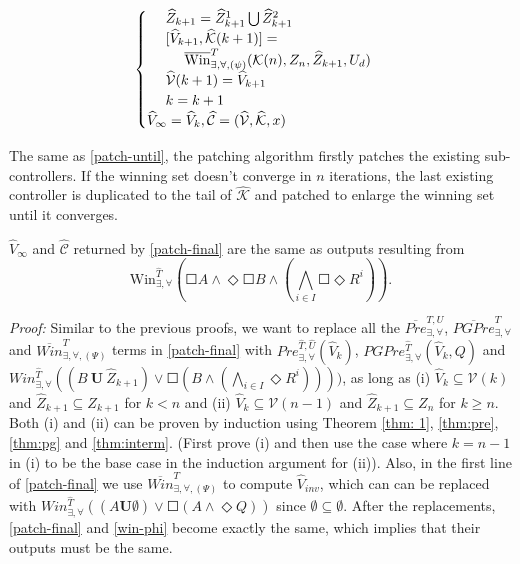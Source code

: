 {\begin{align}
\begin{cases}
\ \ \ \ \widehat{Z}_{k+1} = \widehat{Z}_{k+1}^1\bigcup\widehat{Z}_{k+1}^2  \\
\ \ \ \ [\widehat{V}_{k+1},\widehat{\mathcal{K}}(k+1)]=\\
\ \ \ \ \ \ \ \ \overline{\text{Win}}_{\exists,\forall,(\psi)}^{T}(\mathcal{K}(n),Z_{n},\widehat{Z}_{k+1},U_d)\\
\ \ \ \ \widehat{\mathcal{V}}(k+1)=\widehat{V}_{k+1}\\
\ \ \ \ {\color{black} k = k+1}\\
\widehat{V}_\infty = \widehat{V}_k, \widehat{\mathcal{C}} = (\widehat{\mathcal{V}},\widehat{\mathcal{K}},x) 
\end{cases}\label{patch-final}
\end{align}
}

The same as \eqref{patch-until}, the patching algorithm firstly patches the existing sub-controllers. If the winning set doesn't converge in $ n $ iterations, the last existing controller is duplicated to the tail of $ \widehat{\mathcal{K}} $ and patched to enlarge the winning set until it converges. 

\begin{theorem}
	$ \widehat{V}_\infty $ and $ \widehat{\mathcal{C}} $ returned by \eqref{patch-final} are the same as outputs resulting from
\begin{displaymath}
	\text{Win}_{\exists, \forall}^{\widehat{T}}\left(\Square A \wedge \Diamond \Square B \wedge \left( \bigwedge_{i\in I} \Square \Diamond R^i\right)\right).
\end{displaymath} \label{thm:phi}
\end{theorem}
\emph{Proof:} Similar to the previous proofs, we want to replace all the $ \overline{Pre}^{T,U}_{\exists,\forall} $, $ \overline{PGPre}^{T}_{\exists,\forall} $ and $ \overline{Win}_{\exists,\forall, (\Psi)}^{T} $ terms in \eqref{patch-final} with $ Pre^{\widehat{T},\widehat{U}}_{\exists,\forall}(\widehat{V}_k) $, $PGPre^{\widehat{T}}_{\exists,\forall}(\widehat{V}_k, Q) $ and $ Win^{\widehat{T}}_{\exists,\forall}((B\ \mathbf{U}\ \widehat{Z}_{k+1})\vee\Square (B\wedge (\bigwedge_{i\in I}\Diamond R^i)))) $, as long as (i) $ \widehat{V}_{k} \subseteq \mathcal{V}(k) $ and $ \widehat{Z}_{k+1}\subseteq Z_{k+1} $ for $ k < n $ and (ii) $ \widehat{V}_k\subseteq \mathcal{V}(n-1) $ and $ \widehat{Z}_{k+1}\subseteq Z_n $ for $ k\geq n $. Both (i) and (ii) can be proven by induction using Theorem \ref{thm: 1}, \ref{thm:pre}, \ref{thm:pg} and \ref{thm:interm}. (First prove (i) and then use the case where $ k=n-1 $ in (i) to be the base case in the induction argument for (ii)). Also, in the first line of \eqref{patch-final} we use $ \overline{Win}_{\exists,\forall,(\Psi)}^{T} $ to compute $ \widehat{V}_{inv} $, which can can be replaced with $ Win_{\exists,\forall}^{\widehat{T}}((A\mathbf{U}\emptyset)\vee \Square(A\wedge \Diamond Q)) $ since $ \emptyset\subseteq \emptyset $. After the replacements, \eqref{patch-final} and \eqref{win-phi} become exactly the same, which implies that their outputs must be the same. \QEDB

